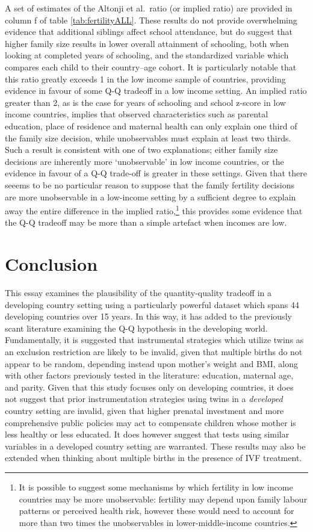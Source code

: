 \documentclass{article}[11pt,subeqn]
\begin{document}
\begin{spacing}{1.5}
A set of estimates of the Altonji et al.\ ratio (or implied ratio) are provided in column f of table \ref{tab:fertilityALL}.  These results do not provide overwhelming evidence
that additional siblings affect school attendance, but do suggest that higher family size results in lower overall attainment of schooling, both when looking at completed years of schooling, and the standardized variable which compares each child to their country--age cohort.  It is particularly notable that this ratio greatly exceeds 1 in the low income sample of
countries, providing evidence in favour of some Q-Q tradeoff in a low income setting.  An implied ratio greater than 2, as is the case for years of schooling and school z-score in low income countries, implies that observed characteristics such as parental education, place of residence and maternal health can only explain one third of the family size decision, while unobservables must explain at least two thirds.  Such a result is consistent with one of two explanations; either family size decisions are inherently more `unobservable' in low income countries, or the evidence in favour of a Q-Q trade-off is greater in these settings.  Given that there seeems to be no particular reason to suppose that the family fertility decisions are more unobservable in a low-income setting by a sufficient degree to explain away the entire difference in the implied ratio,\footnote{It is possible to suggest some mechanisms by which fertility in low income countries may be more unobservable: fertility may depend upon family labour patterns or perceived health risk, however these would need to account for more than two times the unobservables in lower-middle-income countries.} this provides some evidence that the Q-Q tradeoff may be more than a simple artefact when incomes are low. 

\section{Conclusion}
\label{scn:conclusion}
This essay examines the plausibility of the quantity-quality tradeoff in a developing country setting using a particularly powerful dataset which spans 44 developing countries over 15 years.  In this way, it has added to the previously scant literature examining the Q-Q hypothesis in the developing world.  Fundamentally, it is suggested that instrumental strategies which utilize twins as an exclusion restriction are likely to be invalid, given that multiple births do not appear to be random, depending instead upon mother's weight and BMI, along with other factors previously tested in the literature: education, maternal age, and parity.  Given that this study focuses only on developing countries, it does not suggest that prior instrumentation strategies using twins in a \emph{developed} country setting are invalid, given that higher prenatal investment and more comprehensive public policies may act to compensate children whose mother is less healthy or less educated.  It does however suggest that tests using similar variables in a developed country setting are warranted.  These results may also  be extended when thinking about multiple births in the presence of IVF treatment.


\end{spacing}
\end{document}

